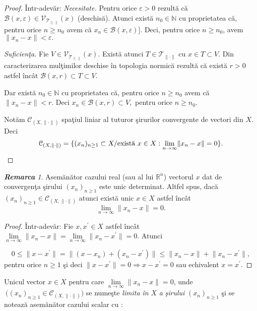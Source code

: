 \documentclass[ a4paper, 12pt]{report}
\theoremstyle{definition}
\theoremstyle{remark}
\newtheorem{remarc}{\bf Remarca}[section]
\numberwithin{equation}{section}
\begin{document}
\begin{proof}
\^Intr-adev\u ar: {\it Necesitate.} Pentru orice  $\varepsilon >0$ rezult\u a c\u a $\mathcal{B}(x,\varepsilon) \in \mathcal{V}_{\mathcal{T}_{\lVert \cdot \rVert}}(x)$ (deschis\u a). Atunci exist\u a $n_0 \in \mathbb{N}$  cu proprietatea c\u a, pentru orice $ n \geq n_0 $ avem c\u a  $ x_n \in \mathcal{B}(x,\varepsilon)]$. Deci, pentru orice $n \geq n_0$, avem  $\lVert x_n - x\rVert < \varepsilon.$

{\it Suficien\c ta.} Fie $V \in \mathcal{V}_{\mathcal{T}_{\lVert \cdot \rVert}}(x)$. Exist\u a atunci  $T \in \mathcal{T}_{\lVert \cdot \rVert}$ cu  $x \in T \subset V$. Din caracterizarea mul\c timilor deschise \^in topologia normic\u a rezult\u a c\u a exist\u a   $r>0$ astfel \^inc\^at $ \mathcal{B}(x,r) \subset T \subset V.$

Dar exist\u a $ n_0 \in \mathbb{N}$ cu proprietatea c\u a, pentru orice $ n \geq n_0$ avem c\u a $\lVert x_n - x \rVert < r$. Deci $x_n \in \mathcal{B}(x,r) \subset V,$ pentru orice $n \geq n_0.$

\medskip

 Not\u am $\mathcal{C}_{(X,\lVert \cdot \rVert)}$ spa\c tiul liniar al tuturor \c sirurilor convergente de vectori din $X$. Deci
$$\mathcal{C}_{(X,\lVert \cdot \rVert) } =\{ (x_n)_{n \geq 1} \subset X / \hbox{exist\u a } x \in X: \lim\limits_{n \rightarrow \infty} \lVert x_n - x \rVert = 0\}.$$
\end{proof}
\begin{remarc}
Asem\u an\u ator cazului real (sau al lui $\mathbb{R}^{n}$) vectorul $x$ dat de convergen\c ta \c sirului $(x_n)_{n \geq 1}$ este unic determinat.  Altfel spus, dac\u a $(x_n)_{n \geq 1} \in \mathcal{C}_{(X,\lVert \cdot \rVert)}$ atunci exist\u a unic $ x \in X$ astfel \^inc\^at \[\lim\limits_{n \rightarrow \infty} \lVert x_n - x \rVert = 0.\]
\end{remarc}
\begin{proof}
\^Intr-adev\u ar: Fie $x,x^{'} \in X$ astfel \^inc\^at $\lim\limits_{n \rightarrow \infty} \lVert x_n - x \rVert = \lim\limits_{n \rightarrow \infty} \lVert x_n - x^{'} \rVert = 0.$ Atunci

$$0 \leq \lVert x-x^{'} \rVert = \lVert (x - x_n) + (x_n - x^{'}) \rVert
 \leq \lVert x_n - x \rVert + \lVert x_n - x^{'} \rVert,$$ pentru orice $n \geq 1$ \c si deci $ \lVert x - x^{'} \rVert = 0 \Rightarrow x - x^{'} = 0 $ sau echivalent  $x = x^{'}.$
\end{proof}

Unicul vector $x \in X$  pentru care $\lim\limits_{n \rightarrow \infty} \lVert x_n - x \rVert = 0$, unde $\  \Big( (x_n)_{n \geq 1} \in \mathcal{C}_{(X, \lVert \cdot \rVert)}  \Big)$ se nume\c ste \emph{limita \^in} $X$ \emph{a} \emph{\c sirului} $(x_n)_{n \geq 1}$ \c si se noteaz\u a asem\u an\u ator cazului scalar cu :
\end{document}
